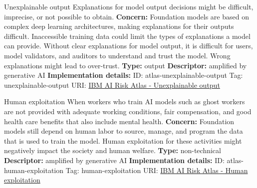 \documentclass[a4paper,12pt]{article}
\begin{document}
\begin{definitionbox}{Unexplainable output}
Explanations for model output decisions might be difficult, imprecise, or not possible to obtain.\newline\newline
\textbf{Concern: }Foundation models are based on complex deep learning architectures, making explanations for their outputs difficult. Inaccessible training data could limit the types of explanations a model can provide. Without clear explanations for model output, it is difficult for users, model validators, and auditors to understand and trust the model. Wrong explanations might lead to over-trust.\newline\newline
\textbf{Type: }output\newline
\textbf{Descriptor: }amplified by generative AI \newline\newline
\textbf{Implementation details: } \newline
ID: atlas-unexplainable-output \newline
Tag: unexplainable-output \newline
URI:  \href{https://www.ibm.com/docs/en/watsonx/saas?topic=SSYOK8/wsj/ai-risk-atlas/unexplainable-output.html}{IBM AI Risk Atlas - Unexplainable output}\newline
\end{definitionbox}
\begin{definitionbox}{Human exploitation}
When workers who train AI models such as ghost workers are not provided with adequate working conditions, fair compensation, and good health care benefits that also include mental health.\newline\newline
\textbf{Concern: }Foundation models still depend on human labor to source, manage, and program the data that is used to train the model. Human exploitation for these activities might negatively impact the society and human welfare. \newline\newline
\textbf{Type: }non-technical\newline
\textbf{Descriptor: }amplified by generative AI \newline\newline
\textbf{Implementation details: } \newline
ID: atlas-human-exploitation \newline
Tag: human-exploitation \newline
URI:  \href{https://www.ibm.com/docs/en/watsonx/saas?topic=SSYOK8/wsj/ai-risk-atlas/human-exploitation.html}{IBM AI Risk Atlas - Human exploitation}\newline
\end{definitionbox}
\end{document}
